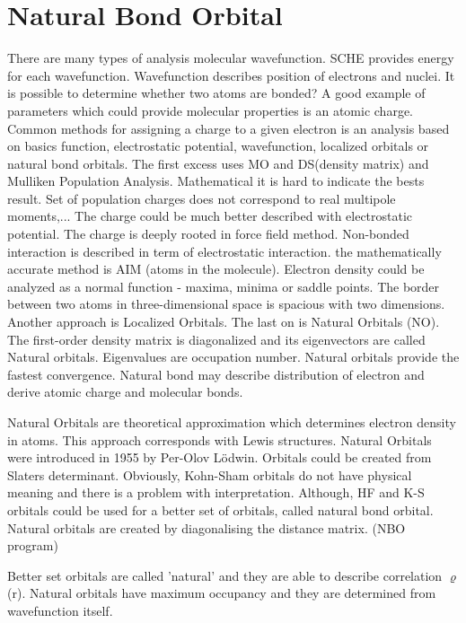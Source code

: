 \documentclass[
  digital, %
  table,   %
  lof,     %
  lot,     %
]{fithesis3}
\begin{document}
\section{Natural Bond Orbital}
There are many types of analysis molecular wavefunction. SCHE provides energy for each wavefunction. Wavefunction describes position of electrons and nuclei. It is possible to determine whether two atoms are bonded? A good example of parameters which could provide molecular properties is an atomic charge. Common methods for assigning a charge to a given electron is an analysis based on basics function, electrostatic potential, wavefunction, localized orbitals or natural bond orbitals. The first excess uses MO and DS(density matrix) and Mulliken Population Analysis. Mathematical it is hard to indicate the bests result. Set of population charges does not correspond to real multipole moments,...  The charge could be much better described with electrostatic potential. The charge is deeply rooted in force field method. Non-bonded interaction is described in term of electrostatic interaction. the mathematically accurate method is AIM (atoms in the molecule). Electron density could be analyzed as a normal function - maxima, minima or saddle points. The border between two atoms in three-dimensional space is spacious with two dimensions. Another approach is Localized Orbitals. The last on is Natural Orbitals (NO). The first-order density matrix is diagonalized and its eigenvectors are called Natural orbitals. Eigenvalues are occupation number. Natural orbitals provide the fastest convergence. Natural bond may describe distribution of electron and derive atomic charge and molecular bonds.\cite{jensen2007introduction}


Natural Orbitals are theoretical approximation which determines electron density in atoms. This approach corresponds with Lewis structures. Natural Orbitals were introduced in 1955 by Per-Olov Lödwin. Orbitals could be created from Slaters determinant. Obviously, Kohn-Sham orbitals do not have physical meaning and there is a problem with interpretation. Although, HF and K-S orbitals could be used for a better set of orbitals, called natural bond orbital. Natural orbitals are created by diagonalising the distance matrix. (NBO program)

Better set orbitals are called 'natural' and they are able to describe correlation $\varrho$(r). Natural orbitals have maximum occupancy and they are determined from wavefunction itself.
\end{document}
